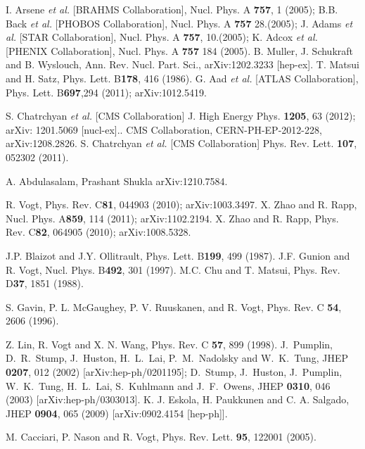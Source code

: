 \documentclass[aps,prc,preprint,superscriptaddress,showpacs,showkeys]{revtex4-1}
\begin{document}
\noindent
\begin{thebibliography}{100}
\medskip
{} I. Arsene {\it et al.} [BRAHMS Collaboration], Nucl. Phys. A {\bf 757}, 1 (2005); 
  B.B. Back {\it et al.} [PHOBOS Collaboration], Nucl. Phys. A {\bf 757} 28.(2005); 
  J. Adams {\it et al.} [STAR Collaboration], Nucl. Phys. A {\bf 757}, 10.(2005); 
  K. Adcox {\it et al.} [PHENIX Collaboration], Nucl. Phys. A {\bf 757} 184 (2005).
 B. Muller, J. Schukraft and B. Wyslouch, Ann. Rev. Nucl. Part. Sci., arXiv:1202.3233 [hep-ex].
 T. Matsui and H. Satz, Phys. Lett. B{\bf 178}, 416 (1986).
 G. Aad {\it et al.} [ATLAS Collaboration], Phys. Lett. B{\bf 697},294 (2011); arXiv:1012.5419.

 S. Chatrchyan {\it et al.} [CMS Collaboration]
 J. High Energy Phys. {\bf 1205}, 63 (2012);  arXiv: 1201.5069 [nucl-ex]..
 CMS Collaboration, CERN-PH-EP-2012-228, arXiv:1208.2826.
 S. Chatrchyan {\it et al.} [CMS Collaboration] Phys. Rev. Lett. {\bf 107}, 052302 (2011).

 A. Abdulasalam, Prashant Shukla arXiv:1210.7584.

 R. Vogt, Phys. Rev. C{\bf 81}, 044903 (2010); arXiv:1003.3497.
 X. Zhao and R. Rapp, Nucl. Phys. A{\bf 859}, 114 (2011); arXiv:1102.2194. 
 X. Zhao and R. Rapp, Phys. Rev. C{\bf 82}, 064905 (2010); arXiv:1008.5328.

 J.P. Blaizot and J.Y. Ollitrault, Phys. Lett. B{\bf 199}, 499 (1987).
 J.F. Gunion and R. Vogt, Nucl. Phys. B{\bf 492}, 301 (1997).
 M.C. Chu and T. Matsui, Phys. Rev. D{\bf 37}, 1851 (1988).


 S. Gavin, P. L. McGaughey, P. V. Ruuskanen, and R. Vogt,
               Phys. Rev. C {\bf 54}, 2606 (1996).
               
 Z. Lin, R. Vogt and X. N. Wang, Phys. Rev. C {\bf 57}, 899 (1998).
 J.~Pumplin, D.~R.~Stump, J.~Huston, H.~L.~Lai, P.~M.~Nadolsky 
and W.~K.~Tung,
  JHEP {\bf 0207}, 012 (2002)
  [arXiv:hep-ph/0201195];
  D.~Stump, J.~Huston, J.~Pumplin, W.~K.~Tung, H.~L.~Lai, S.~Kuhlmann 
  and J.~F.~Owens,
  JHEP {\bf 0310}, 046 (2003) 
  [arXiv:hep-ph/0303013].
 K. J. Eskola, H. Paukkunen and C. A. Salgado, JHEP
{\bf 0904}, 065 (2009) [arXiv:0902.4154 [hep-ph]].

 M. Cacciari, P. Nason and R. Vogt, Phys. Rev. Lett.
{\bf 95}, 122001 (2005).


\end{thebibliography}
\end{document}
